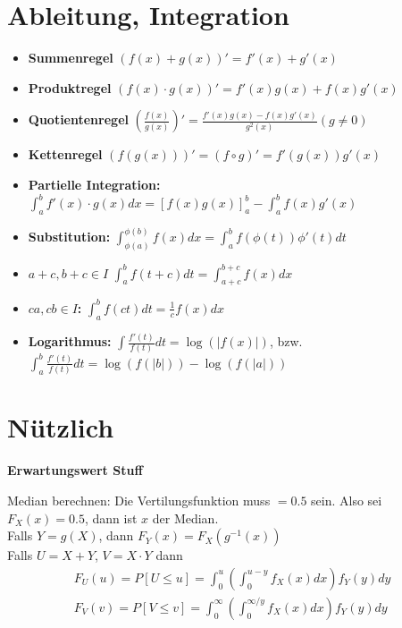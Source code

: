 \section{Ableitung, Integration}

\begin{itemize}
 	\item \textbf{Summenregel} $(f(x)+g(x))' = f'(x) + g'(x)$
    \item \textbf{Produktregel} $(f(x)\cdot g(x))' = f'(x)g(x) + f(x)g'(x)$
    \item \textbf{Quotientenregel} $\left(\frac{f(x)}{g(x)}\right)' = \frac{f'(x)g(x) - f(x)g'(x)}{g^2(x)}(g\neq 0)$
    \item \textbf{Kettenregel} $(f(g(x)))' = (f\circ g)' = f'(g(x))g'(x)$
\end{itemize}

\begin{itemize}
  \item \textbf{Partielle Integration:} $\int_a^b f'(x)\cdot g(x)dx = \left[f(x)g(x)\right]_a^b - \int_a^b f(x)g'(x)$
  \item \textbf{Substitution:} $\int_{\phi(a)}^{\phi(b)} f(x)dx = \int_a^b f(\phi(t))\phi '(t) dt$
  \item \textbf{$a+c, b+c \in I$} $\int_a^b f(t+c)dt = \int_{a+c}^{b+c} f(x)dx$
  \item \textbf{$ca,cb\in I$: } $\int_a^b f(ct)dt = \frac{1}{c}f(x)dx$
  \item \textbf{Logarithmus: }\;$\int\frac{f'(t)}{f(t)}dt = \log(|f(x)|)$, bzw. $\int_a^b\frac{f'(t)}{f(t)}dt = \log(f(|b|)) - \log(f(|a|))$
\end{itemize}

\section{Nützlich}

\textbf{Erwartungswert Stuff}



Median berechnen: Die Vertilungsfunktion muss $= 0.5$ sein. Also sei $F_X(x) = 0.5$, dann ist $x$ der Median.\\

Falls $Y = g(X)$, dann $F_Y(x) = F_X(g^{-1}(x))$\\
Falls $U = X + Y$, $V = X \cdot Y$ dann
\begin{align*}
	F_U(u) = P[U \leq u] = \int_0^u \left(\int_0^{u-y}f_X(x) dx\right)f_Y(y) dy\\
	F_V(v) = P[V \leq v] = \int_0^\infty \left(\int_0^{\infty/y}f_X(x) dx\right)f_Y(y) dy
\end{align*}

